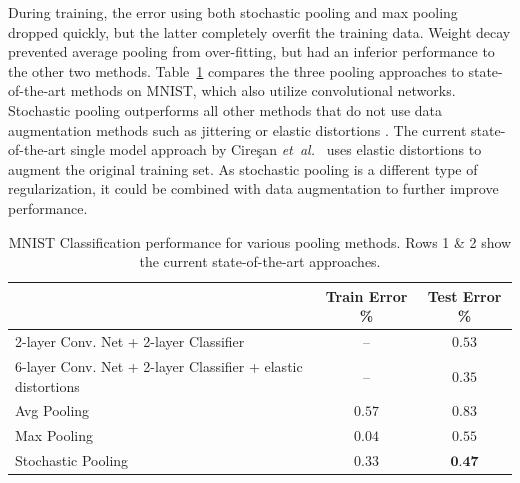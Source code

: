 \documentclass{article} %
\newcommand{\tab}[1]{Table~\ref{tab:#1}}
\def\etal{{\textit{et~al.~}}}
\begin{document}
During training, the error using both stochastic pooling and max
pooling dropped quickly, but the latter completely overfit the
training data. Weight decay prevented average pooling from
over-fitting, but had an inferior performance to the other two
methods. \tab{mnist} compares the three pooling approaches to
state-of-the-art methods on MNIST, which also utilize convolutional
networks. Stochastic pooling outperforms all other methods that do not use
data augmentation methods such as jittering or elastic distortions \cite{mnistresults}.
The current state-of-the-art single model approach by Cireşan \etal
\cite{Ciresan11} uses elastic distortions to augment the
original training set. As stochastic pooling is a different type of
regularization, it could be combined with data augmentation to further
improve performance.




\begin{table}[h!]
\small
\vspace*{-2mm}
\begin{center}
\begin{tabular}{|l|c|c|}
  \hline
  & Train Error \% & Test Error \% \\
  \hline 2-layer Conv. Net + 2-layer Classifier  \cite{Jarrett2009} & -- & $0.53$ \\
  \hline 6-layer Conv. Net + 2-layer Classifier + elastic distortions \cite{Ciresan11} & -- & $0.35$ \\
  \hline  \hline   %
  Avg Pooling & $0.57$ & $0.83$ \\
  \hline %
  Max Pooling & $0.04$ & $0.55$ \\
  \hline %
  Stochastic Pooling & $0.33$ & $\textbf{0.47}$ \\
  \hline
\end{tabular}
\vspace*{-2mm}
\caption{MNIST Classification performance for various pooling
  methods. Rows 1 \& 2 show the current state-of-the-art
  approaches.}
\label{tab:mnist}
\end{center}
\vspace*{-5mm}
\end{table}
\end{document}
